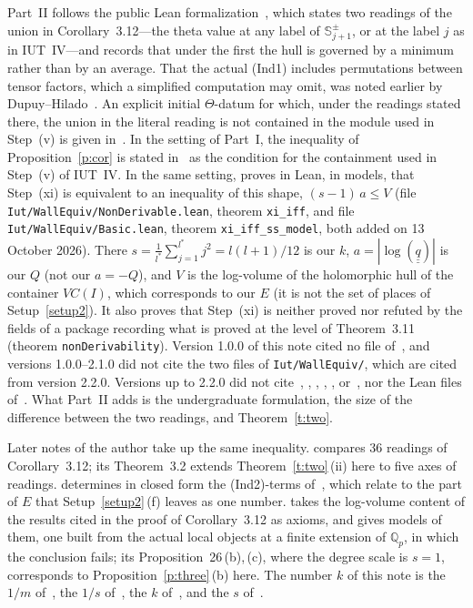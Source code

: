 \documentclass[11pt,a4paper]{article}
\newcommand{\qq}{\underline{\underline{q}}{}}
\theoremstyle{plain}
\theoremstyle{definition}
\theoremstyle{remark}
\begin{document}
Part~II follows the public Lean formalization~\cite{LANAiut}, which states two readings of the union in
Corollary~3.12---the theta value at any label of $\mathbb{S}^\pm_{j+1}$, or at the label $j$ as in IUT~IV---and
records that under the first the hull is governed by a minimum rather than by an average. That the actual (Ind1)
includes permutations between tensor factors, which a simplified computation may omit, was noted earlier by
Dupuy--Hilado~\cite[\S6.2, footnote~7]{DH}. An explicit initial $\Theta$-datum for which, under the readings
stated there, the union in the literal reading is not contained in the module used in Step~(v) is given
in~\cite{Note}. In the setting of Part~I, the inequality of Proposition~\ref{p:cor} is
stated in~\cite{TK} as the condition for the containment used in Step~(v) of IUT~IV. In the same setting,
\cite{LANAiut} proves in Lean, in models, that Step~(xi) is equivalent to an inequality of this shape, $(s-1)\,a\le V$
(file \texttt{Iut/WallEquiv/NonDerivable.lean}, theorem \texttt{xi\_iff}, and file \texttt{Iut/WallEquiv/Basic.lean},
theorem \texttt{xi\_iff\_ss\_model}, both added on 13 October 2026). There
$s=\frac{1}{l^\ast}\sum_{j=1}^{l^\ast}j^2=l(l+1)/12$ is our $k$, $a=|\log(\qq)|$ is our $Q$ (not our $a=-Q$), and $V$
is the log-volume of the holomorphic hull of the container $\mathit{VC}(I)$, which corresponds to our $E$ (it is not the set of
places of Setup~\ref{setup2}). It also proves that Step~(xi) is neither proved nor refuted by the fields of a package
recording what is proved at the level of Theorem~3.11 (theorem \texttt{nonDerivability}). Version 1.0.0 of this note
cited no file of~\cite{LANAiut}, and versions 1.0.0--2.1.0 did not cite the two files of \texttt{Iut/WallEquiv/},
which are cited from version 2.2.0. Versions up to 2.2.0 did not cite~\cite{Go}, \cite{Sf}, \cite{Wh}, \cite{Hi},
\cite{Pajo}, \cite{Form} or~\cite{Ri}, nor the Lean files of~\cite{TK}. What Part~II adds is the
undergraduate formulation, the size of the difference between the two readings, and Theorem~\ref{t:two}.

Later notes of the author take up the same inequality. \cite{RF} compares 36 readings of Corollary~3.12; its
Theorem~3.2 extends Theorem~\ref{t:two}\,(ii) here to five axes of readings. \cite{Gap} determines in closed form the
(Ind2)-terms of~\cite{LANAiut}, which relate to the part of $E$ that Setup~\ref{setup2}\,(f) leaves as one number.
\cite{W311} takes the log-volume content of the results cited in the proof of Corollary~3.12 as axioms, and gives
models of them, one built from the actual local objects at a finite extension of $\mathbb{Q}_p$, in which the
conclusion fails; its Proposition~26\,(b),\,(c), where the degree scale is $s=1$, corresponds to
Proposition~\ref{p:three}\,(b) here. The number $k$ of this note is the $1/m$ of~\cite{Ur}, the $1/s$
of~\cite{W311}, the $k$ of~\cite{RF,TC,BS}, and the $s$ of~\cite{LANAiut}.
\end{document}
